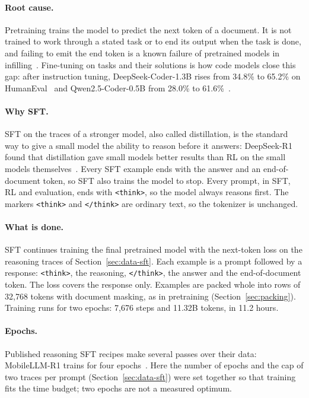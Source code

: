 \documentclass[sigconf,nonacm,balance=false]{acmart}
\begin{document}
\paragraph{Root cause.} Pretraining trains the model to predict the next token of a document. It is not trained to
work through a stated task or to end its output when the task is done, and failing to emit the end token is a known
failure of pretrained models in infilling~\cite{bavarian2022fim}. Fine-tuning on tasks and their solutions is how code
models close this gap: after instruction tuning, DeepSeek-Coder-1.3B rises from 34.8\% to 65.2\% on
HumanEval~\cite{guo2024deepseekcoder} and Qwen2.5-Coder-0.5B from 28.0\% to 61.6\%~\cite{hui2024qwen25coder}.

\paragraph{Why SFT\@.} SFT on the traces of a stronger model, also called distillation, is the standard way to give a
small model the ability to reason before it answers: DeepSeek-R1 found that distillation gave small models better
results than RL on the small models themselves~\cite{deepseek2025r1}. Every SFT example ends with the answer and an
end-of-document token, so SFT also trains the model to stop. Every prompt, in SFT, RL and evaluation, ends with
\texttt{<think>}, so the model always reasons first. The markers \texttt{<think>} and \texttt{</think>} are ordinary
text, so the tokenizer is unchanged.

\paragraph{What is done.} SFT continues training the final pretrained model with the next-token loss on the
reasoning traces of Section~\ref{sec:data-sft}. Each example is a prompt followed by a response: \texttt{<think>},
the reasoning, \texttt{</think>}, the answer and the end-of-document token. The loss covers the response only.
Examples are packed whole into rows of 32,768 tokens with document masking, as in pretraining
(Section~\ref{sec:packing}). Training runs for two epochs: 7,676 steps and 11.32B tokens, in 11.2 hours.

\paragraph{Epochs.} Published reasoning SFT recipes make several passes over their data: MobileLLM-R1 trains for
four epochs~\cite{zhao2025mobilellmr1}. Here the number of epochs and
the cap of two traces per prompt (Section~\ref{sec:data-sft}) were set together so that training fits the time budget;
two epochs are not a measured optimum.
\end{document}
